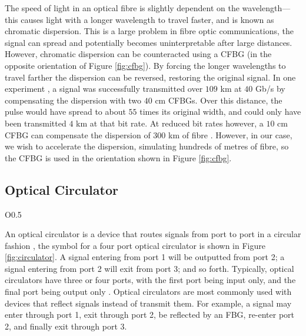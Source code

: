 The speed of light in an optical fibre is slightly dependent on the wavelength---this causes light with a longer wavelength to travel faster, and is known as chromatic dispersion. This is a large problem in fibre optic communications, the signal can spread and potentially becomes uninterpretable after large distances. However, chromatic dispersion can be counteracted using a CFBG \cite{agrawal2002, alazzawi, becker, starodoumov} (in the opposite orientation of Figure \ref{fig:cfbg}). By forcing the longer wavelengths to travel farther the dispersion can be reversed, restoring the original signal. In one experiment \cite{dong}, a signal was successfully transmitted over $109$ km at $40$ Gb/s by compensating the dispersion with two  $40$ cm CFBGs. Over this distance, the pulse would have spread to about $55$ times its original width, and could only have been transmitted $4$ km at that bit rate. At reduced bit rates however, a $10$ cm CFBG can compensate the dispersion of $300$ km of fibre \cite{agrawal2002}. However, in our case, we wish to accelerate the dispersion, simulating hundreds of metres of fibre, so the CFBG is used in the orientation shown in Figure \ref{fig:cfbg}. \\

\subsection{Optical Circulator}
\begin{wrapfigure}{O}{0.5\textwidth}
\centering

\caption[Optical Circulator]{Symbol for a four port optical circulator.}
\label{fig:circulator}
\end{wrapfigure}
An optical circulator is a device that routes signals from port to port in a circular fashion \cite{agrawal2002, alazzawi, becker}, the symbol for a four port optical circulator is shown in Figure \ref{fig:circulator}. A signal entering from port 1 will be outputted from port 2; a signal entering from port 2 will exit from port 3; and so forth. Typically, optical circulators have three or four ports, with the first port being input only, and the final port being output only \cite{alazzawi}. Optical circulators are most commonly used with devices that reflect signals instead of transmit them. For example, a signal may enter through port 1, exit through port 2, be reflected by an FBG, re-enter port 2, and finally exit through port 3. \\

